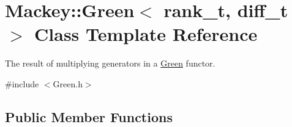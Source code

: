 \hypertarget{classMackey_1_1Green}{}\section{Mackey\+:\+:Green$<$ rank\+\_\+t, diff\+\_\+t $>$ Class Template Reference}
\label{classMackey_1_1Green}


The result of multiplying generators in a \hyperlink{classMackey_1_1Green}{Green} functor.  




{\ttfamily \#include $<$Green.\+h$>$}

\subsection*{Public Member Functions}

